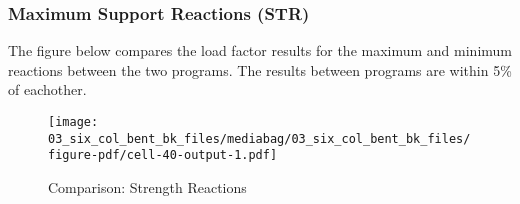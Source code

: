 \documentclass[
  letterpaper,
  DIV=11,
  numbers=noendperiod]{scrartcl}
\begin{document}
\newpage{}

\subsubsection{Maximum Support Reactions
(STR)}\label{maximum-support-reactions-str-2}

The figure below compares the load factor results for the maximum and
minimum reactions between the two programs. The results between programs
are within 5\% of eachother.

\begin{figure}[H]

{\centering \texttt{[image: 03\_six\_col\_bent\_bk\_files/mediabag/03\_six\_col\_bent\_bk\_files/figure-pdf/cell-40-output-1.pdf]}

}

\caption{Comparison: Strength Reactions}

\end{figure}%
\end{document}

